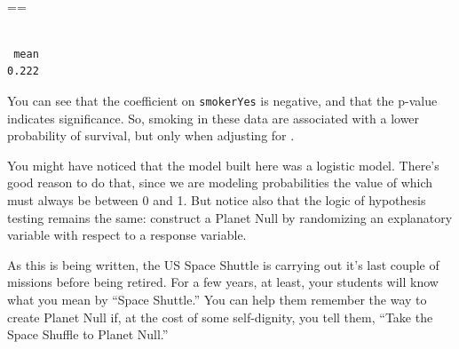 \begin{example}
\begin{knitrout}
{\begin{kframe}
\begin{flushleft}
\ttfamily\noindent
{}\hspace*{\fill}\\
\hlstd{}\hlassignement{\usebox{\hlnormalsizeboxlessthan}-}{\ }\hlkeyword{(}\hlkeyword{)}{\ }\hlkeyword{*}{\ }\hlkeyword{(}=={\ }\hlkeyword{\urltilda{}}{\ }\hlkeyword{(}\hlkeyword{)}{\ }\hlkeyword{+}\hspace*{\fill}\\
\hlstd{}{\ }{\ }{\ }{\ }\hlkeyword{,}{\ }\hlargument{=}{\ }\hlkeyword{,}{\ }\hlargument{=}{\ }\hlkeyword{)}\hspace*{\fill}\\
\hlstd{}\hlkeyword{(}\hlkeyword{,}{\ }\hlkeyword{(}\hlkeyword{(}\hlkeyword{)}{\ }\hlkeyword{\usebox{\hlnormalsizeboxgreaterthan}}{\ }\hlkeyword{(}\hlkeyword{-}\hlkeyword{)}\hlkeyword{)}\hlkeyword{)}{\ }{\ }\mbox{}
\normalfont
\end{flushleft}
\begin{verbatim}
 mean 
0.222 
\end{verbatim}
\end{kframe}}
\end{knitrout}

You can see that the coefficient on \texttt{smokerYes} is negative,
and that the p-value indicates significance.  So, smoking in these
data are associated with a lower probability of survival, but only
when adjusting for .

You might have noticed that the model built here was a logistic
model.  There's good reason to do that, since we are modeling
probabilities the value of which must always be between 0 and 1.  But
notice also that the logic of hypothesis testing remains the same:
construct a Planet Null by randomizing an explanatory variable with
respect to a response variable.
\end{example}

As this is being written, the US Space Shuttle is carrying out it's
last couple of missions before being retired.  For a few years, at
least, your students will know what you mean by ``Space Shuttle.''
You can help them remember the way to create Planet Null if, at the
cost of some self-dignity, you tell them, ``Take the Space Shuffle to
Planet Null.''


